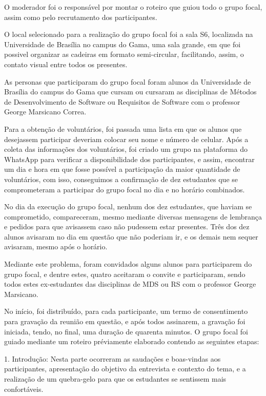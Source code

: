 O moderador foi o responsável por montar o roteiro que guiou todo o grupo focal, assim como pelo recrutamento dos participantes.

O local selecionado para a realização do grupo focal foi a sala S6, localizada na Universidade de Brasília no campus do Gama, uma sala grande, em que foi possivel organizar as cadeiras em formato semi-circular, facilitando, assim, o contato visual entre todos os presentes.

As personas que participaram do grupo focal foram alunos da Universidade de Brasília do campus do Gama que cursam ou cursaram as disciplinas de Métodos de Desenvolvimento de Software ou Requisitos de Software com o professor George Marsicano Correa.

Para a obtenção de voluntários, foi passada uma lista em que os alunos que desejassem participar deveriam colocar seu nome e número de celular. Após a coleta das informações dos voluntários, foi criado um grupo na plataforma do WhatsApp para verificar a disponibilidade dos participantes, e assim, encontrar um dia e hora em que fosse possível a participação da maior quantidade de voluntários, com isso, conseguimos a confirmação de dez estudantes que se comprometeram a participar do grupo focal no dia e no horário combinados.

No dia da execução do grupo focal, nenhum dos dez estudantes, que haviam se comprometido, compareceram, mesmo mediante diversas mensagens de lembrança e pedidos para que avisassem caso não pudessem estar presentes. Três dos dez alunos avisaram no dia em questão que não poderiam ir, e os demais nem sequer avisaram, mesmo após o horário.

Mediante este problema, foram convidados alguns alunos para participarem do grupo focal, e dentre estes, quatro aceitaram o convite e participaram, sendo todos estes ex-estudantes das disciplinas de MDS ou RS com o professor George Marsicano.

No início, foi distribuído, para cada participante, um termo de consentimento para gravação da reunião em questão, e após todos assinarem, a gravação foi iniciada, tendo, no final, uma duração de quarenta minutos. O grupo focal foi guiado mediante um roteiro préviamente elaborado contendo as seguintes etapas:

1. Introdução: Nesta parte ocorreram as saudações e boas-vindas aos participantes, apresentação do objetivo da entrevista e contexto do tema, e a realização de um quebra-gelo para que os estudantes se sentissem mais confortáveis.

